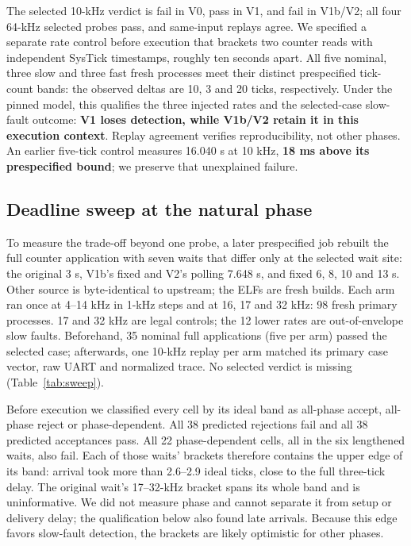 \documentclass[sigconf,nonacm,balance=false]{acmart}
\begin{document}
The selected 10-kHz verdict is fail in V0, pass in V1, and fail in V1b/V2; all four 64-kHz selected probes pass, and same-input replays agree. We specified a separate rate control before execution that brackets two counter reads with independent SysTick timestamps, roughly ten seconds apart. All five nominal, three slow and three fast fresh processes meet their distinct prespecified tick-count bands: the observed deltas are 10, 3 and 20 ticks, respectively. Under the pinned model, this qualifies the three injected rates and the selected-case slow-fault outcome: \textbf{V1 loses detection, while V1b/V2 retain it in this execution context}. Replay agreement verifies reproducibility, not other phases. An earlier five-tick control measures 16.040 s at 10 kHz, \textbf{18 ms above its prespecified bound}; we preserve that unexplained failure.

\subsection{Deadline sweep at the natural phase}\label{sec:sweep}
To measure the trade-off beyond one probe, a later prespecified job rebuilt the full counter application with seven waits that differ only at the selected wait site: the original 3 s, V1b's fixed and V2's polling 7.648 s, and fixed 6, 8, 10 and 13 s. Other source is byte-identical to upstream; the ELFs are fresh builds. Each arm ran once at 4--14 kHz in 1-kHz steps and at 16, 17 and 32 kHz: 98 fresh primary processes. 17 and 32 kHz are legal controls; the 12 lower rates are out-of-envelope slow faults. Beforehand, 35 nominal full applications (five per arm) passed the selected case; afterwards, one 10-kHz replay per arm matched its primary case vector, raw UART and normalized trace. No selected verdict is missing (Table~\ref{tab:sweep}).

\begin{table}[t]
\caption{Natural-phase counter sweep, 14 rates per wait. Ideal band: $[64{,}000/D,96{,}000/D]$. Bracket: highest sampled rejected and lowest sampled accepted rate (kHz), not an exact threshold. Slow acc.: accepted out-of-envelope rates (4--16 kHz). Sel.: selected-case pass/fail.}
\label{tab:sweep}\small\centering\setlength{\tabcolsep}{3pt}

\end{table}

Before execution we classified every cell by its ideal band as all-phase accept, all-phase reject or phase-dependent. All 38 predicted rejections fail and all 38 predicted acceptances pass. All 22 phase-dependent cells, all in the six lengthened waits, also fail. Each of those waits' brackets therefore contains the upper edge of its band: arrival took more than 2.6--2.9 ideal ticks, close to the full three-tick delay. The original wait's 17--32-kHz bracket spans its whole band and is uninformative. We did not measure phase and cannot separate it from setup or delivery delay; the qualification below also found late arrivals. Because this edge favors slow-fault detection, the brackets are likely optimistic for other phases.
\end{document}
